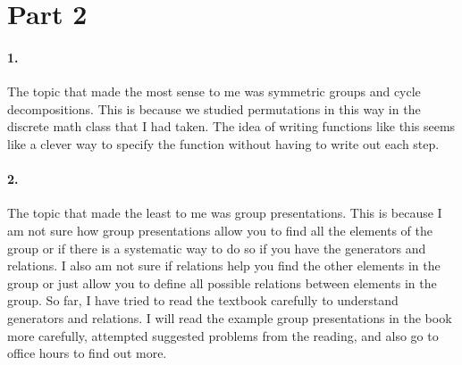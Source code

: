 \documentclass{article}
\begin{document}
\section{Part 2}
\paragraph{1.}
The topic that made the most sense to me was symmetric groups and cycle decompositions. This is because we studied permutations in this way in the discrete math class that I had taken. The idea of writing functions like this seems like a clever way to specify the function without having to write out each step.
\paragraph{2.}
The topic that made the least to me was group presentations. This is because I am not sure how group presentations allow you to find all the elements of the group or if there is a systematic way to do so if you have the generators and relations. I also am not sure if relations help you find the other elements in the group or just allow you to define all possible relations between elements in the group. So far, I have tried to read the textbook carefully to understand generators and relations. I will read the example group presentations in the book more carefully, attempted suggested problems from the reading, and also go to office hours to find out more.
\end{document}
